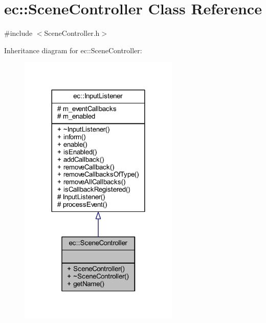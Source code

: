\hypertarget{classec_1_1_scene_controller}{}\section{ec\+:\+:Scene\+Controller Class Reference}
\label{classec_1_1_scene_controller}


{\ttfamily \#include $<$Scene\+Controller.\+h$>$}



Inheritance diagram for ec\+:\+:Scene\+Controller\+:\nopagebreak
\begin{figure}[H]
\begin{center}
\leavevmode
\includegraphics[width=216pt]{classec_1_1_scene_controller__inherit__graph}
\end{center}
\end{figure}


